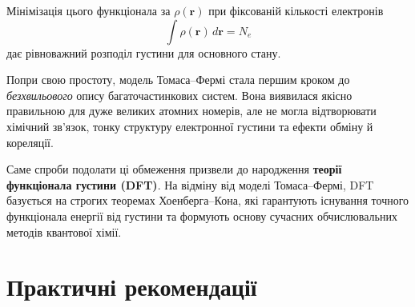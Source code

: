 Мінімізація цього функціонала за $\rho(\mathbf{r})$
при фіксованій кількості електронів
\[
\int \rho(\mathbf{r})\,d\mathbf{r} = N_e
\]
дає рівноважний розподіл густини для основного стану.

Попри свою простоту, модель Томаса–Фермі стала першим кроком
до \emph{безхвильового} опису багаточастинкових систем.
Вона виявилася якісно правильною для дуже великих атомних номерів,
але не могла відтворювати хімічний зв’язок,
тонку структуру електронної густини
та ефекти обміну й кореляції.

Саме спроби подолати ці обмеження призвели до народження
\textbf{теорії функціонала густини (DFT)}.
На відміну від моделі Томаса–Фермі,
DFT базується на строгих теоремах Хоенберга–Кона,
які гарантують існування точного функціонала енергії від густини
та формують основу сучасних обчислювальних методів квантової хімії.




%
%



\section{Практичні рекомендації}

